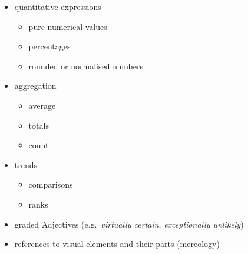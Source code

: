 \begin{itemize}
\item quantitative expressions
\begin{itemize}
   \item pure numerical values
   \item percentages
   \item rounded or normalised numbers
\end{itemize}
\item aggregation
\begin{itemize}
   \item average
   \item totals
   \item count
\end{itemize}
\item trends
\begin{itemize}
   \item comparisons
   \item ranks
\end{itemize}
\item graded Adjectives (e.g.~\emph{virtually certain}, \emph{exceptionally unlikely})
\item references to visual elements and their parts (mereology)
\end{itemize}

